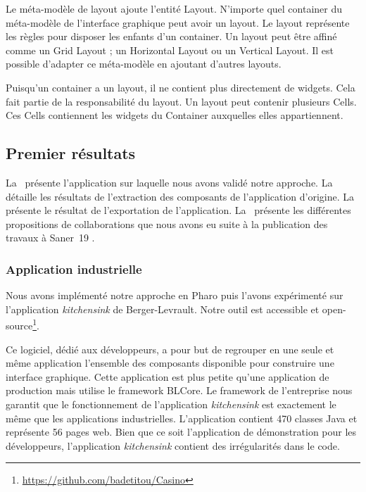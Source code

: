 \documentclass[a4paper]{article}
\begin{document}
Le méta-modèle de layout ajoute l'entité Layout.
N'importe quel container du méta-modèle de l'interface graphique peut avoir un layout.
Le layout représente les règles pour disposer les enfants d'un container.
Un layout peut être affiné comme un Grid Layout ; un Horizontal Layout ou un Vertical Layout.
Il est possible d'adapter ce méta-modèle en ajoutant d'autres layouts.

Puisqu'un container a un layout, il ne contient plus directement de widgets.
Cela fait partie de la responsabilité du layout.
Un layout peut contenir plusieurs Cells.
Ces Cells contiennent les widgets du Container auxquelles elles appartiennent.

\subsection{Premier résultats}
\label{sec:resultats}

La~ présente l'application sur laquelle nous avons validé notre approche.
La~ détaille les résultats de l'extraction des composants de l'application d'origine.
La~ présente le résultat de l'exportation de l'application.
La~ présente les différentes propositions de collaborations que nous avons eu suite à la publication des travaux à Saner~19 \citep{Verh19a}.

\subsubsection{Application industrielle}
\label{sec:industrial}

Nous avons implémenté notre approche en Pharo puis l'avons expérimenté sur l'application \textit{kitchensink} de Berger-Levrault.
Notre outil est accessible et open-source\footnote{\url{https://github.com/badetitou/Casino}}.

Ce logiciel, dédié aux développeurs, a pour but de regrouper en une seule et même application l'ensemble des composants 
 disponible pour construire une interface graphique.
Cette application est plus petite qu'une application de production mais utilise le framework BLCore.
Le framework de l'entreprise nous garantit que le fonctionnement de l'application \textit{kitchensink} est
  exactement le même que les applications industrielles.
L'application contient 470 classes Java et représente 56 pages web.
Bien que ce soit l'application de démonstration pour les développeurs,
 l'application \textit{kitchensink} contient des irrégularités dans le code.
\end{document}
